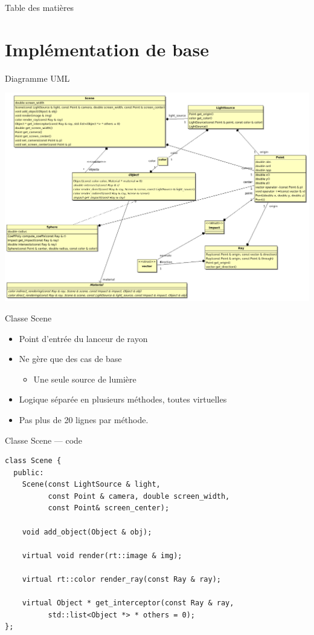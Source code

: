 \documentclass{beamer}
\begin{document}
\begin{frame}{Table des matières}
	\tableofcontents
\end{frame}

\section{Implémentation de base}
\begin{frame}{Diagramme UML}
    \begin{center}
        \includegraphics[scale=0.2]{img/uml.png}
    \end{center}
\end{frame}

\begin{frame}{Classe Scene}
    \begin{itemize}
        \item Point d'entrée du lanceur de rayon
        \item Ne gère que des cas de base
            \begin{itemize}
                \item Une seule source de lumière
            \end{itemize}
        \item Logique séparée en plusieurs méthodes, toutes virtuelles
        \item Pas plus de 20 lignes par méthode.
    \end{itemize}
\end{frame}

\begin{frame}[fragile]{Classe Scene — code}
    \begin{lstlisting}
class Scene {
  public:
    Scene(const LightSource & light,
          const Point & camera, double screen_width,
          const Point& screen_center);

    void add_object(Object & obj);

    virtual void render(rt::image & img);

    virtual rt::color render_ray(const Ray & ray);

    virtual Object * get_interceptor(const Ray & ray,
          std::list<Object *> * others = 0);
};
    \end{lstlisting}
\end{frame}
\end{document}
